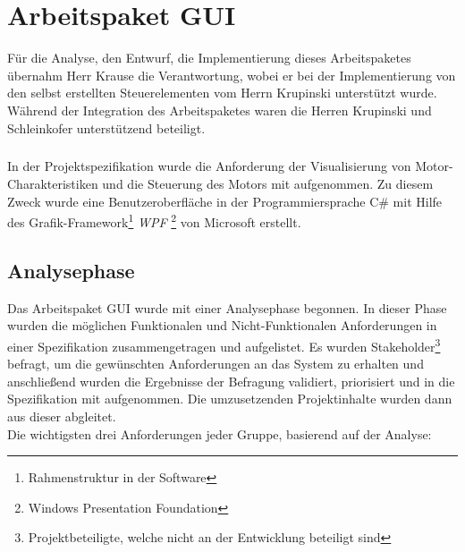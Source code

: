 \graphicspath{{./gui/Bilder/}}

\chapter{Arbeitspaket GUI}
\label{GUI}
Für die Analyse, den Entwurf, die Implementierung dieses Arbeitspaketes übernahm Herr Krause die Verantwortung, wobei er bei der Implementierung von den selbst erstellten Steuerelementen vom Herrn Krupinski unterstützt wurde. Während der Integration des Arbeitspaketes waren die Herren Krupinski und Schleinkofer unterstützend beteiligt.
\paragraph{}
In der Projektspezifikation wurde die Anforderung der Visualisierung von Motor-Charakteristiken und die Steuerung des Motors mit aufgenommen. Zu diesem Zweck wurde eine Benutzeroberfläche in der Programmiersprache C\# mit Hilfe des Grafik-Framework\footnote{Rahmenstruktur in der Software} \textit{WPF} \footnote{Windows Presentation Foundation} von Microsoft erstellt.

\section{Analysephase}
Das Arbeitspaket GUI wurde mit einer Analysephase begonnen. In dieser Phase wurden die möglichen Funktionalen und Nicht-Funktionalen Anforderungen in einer Spezifikation zusammengetragen und aufgelistet. Es wurden Stakeholder\footnote{Projektbeteiligte, welche nicht an der Entwicklung beteiligt sind} befragt, um die gewünschten Anforderungen an das System zu erhalten und anschließend wurden die Ergebnisse der Befragung validiert, priorisiert und in die Spezifikation mit aufgenommen. Die umzusetzenden Projektinhalte wurden dann aus dieser abgleitet.\\
Die wichtigsten drei Anforderungen jeder Gruppe, basierend auf der Analyse: \\

